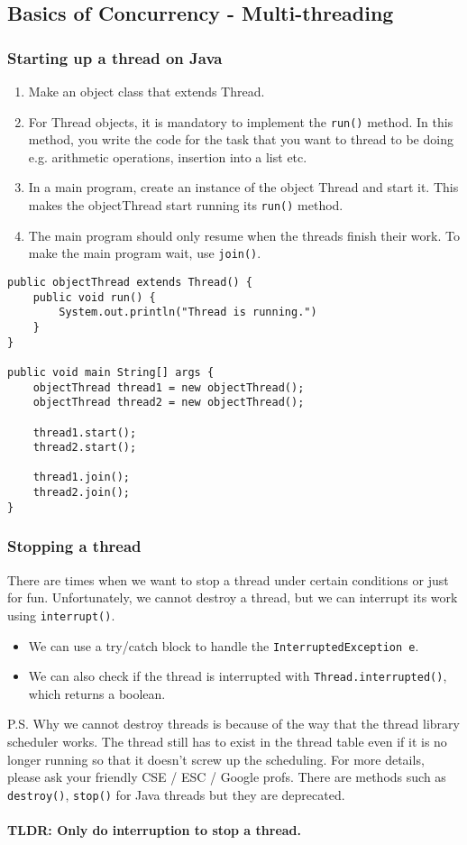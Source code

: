 \documentclass[a4paper]{article}
\begin{document}
\subsection{Basics of Concurrency - Multi-threading}
\subsubsection{Starting up a thread on Java}
\begin{enumerate}
	\item Make an object class that extends Thread.
	\item For Thread objects, it is mandatory to implement the \texttt{run()} method. In this method, you write the code for the task that you want to thread to be doing e.g. arithmetic operations, insertion into a list etc.
	\item In a main program, create an instance of the object Thread and start it. This makes the objectThread start running its \texttt{run()} method.
	\item The main program should only resume when the threads finish their work. To make the main program wait, use \texttt{join()}.
\end{enumerate}
\begin{verbatim}
public objectThread extends Thread() {
	public void run() {
		System.out.println("Thread is running.")
	}
}

public void main String[] args {
	objectThread thread1 = new objectThread();
	objectThread thread2 = new objectThread();

	thread1.start();
	thread2.start();

	thread1.join();
	thread2.join();
}
\end{verbatim}
\subsubsection{Stopping a thread}
There are times when we want to stop a thread under certain conditions or just for fun. Unfortunately, we cannot destroy a thread, but we can interrupt its work using \texttt{interrupt()}.
\begin{itemize}
	\item We can use a try/catch block to handle the \texttt{InterruptedException e}.
	\item We can also check if the thread is interrupted with \texttt{Thread.interrupted()}, which returns a boolean.
\end{itemize}
P.S. Why we cannot destroy threads is because of the way that the thread library scheduler works. The thread still has to exist in the thread table even if it is no longer running so that it doesn't screw up the scheduling. For more details, please ask your friendly CSE / ESC / Google profs. There are methods such as \texttt{destroy()}, \texttt{stop()} for Java threads but they are deprecated. \\
\\
\textbf{TLDR: Only do interruption to stop a thread.}
\end{document}
